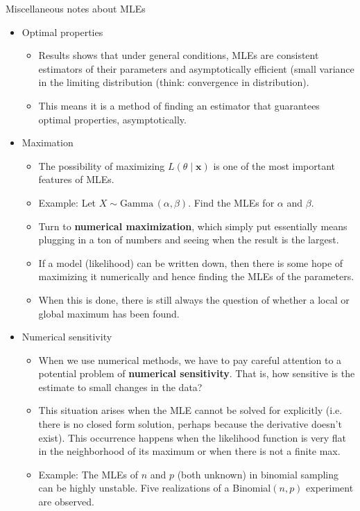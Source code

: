 \documentclass{article}
\newcommand{\follow}[1]{\sim \text{#1}\,}		%
\begin{document}
Miscellaneous notes about MLEs\bigskip
\begin{itemize}
    \item Optimal properties
    \begin{itemize}
        \item 	Results shows that under general conditions, MLEs are consistent estimators of their parameters and asymptotically efficient (small variance in the limiting distribution (think: convergence in distribution).
	\item This means it is a method of finding an estimator that guarantees optimal properties, asymptotically.
    \end{itemize}
    \item Maximation
    \begin{itemize}
         \item	 The possibility of maximizing $L(\theta \mid \mathbf{x})$ is one of the most important features of MLEs.
         \item Example: Let $X \follow{Gamma}(\alpha, \beta)$. Find the MLEs for $\alpha$ and $\beta$.\vspace{70pt}
        \item Turn to \textbf{numerical maximization}, which simply put essentially means plugging in a ton of numbers and seeing when the result is the largest.
        \item[] If a model (likelihood) can be written down, then there is some hope of maximizing it numerically and hence finding the MLEs of the parameters.
        \item[] When this is done, there is still always the question of whether a local or global maximum has been found.
    \end{itemize}\bigskip
    \item Numerical sensitivity
    \begin{itemize}
        \item When we use numerical methods, we have to pay careful attention to a potential problem of \textbf{numerical sensitivity}. That is, how sensitive is the estimate to small changes in the data?
        \item This situation arises when the MLE cannot be solved for explicitly (i.e. there is no closed form solution, perhaps because the derivative doesn't exist). This occurrence happens when the likelihood function is very flat in the neighborhood of its maximum or when there is not a finite max.
        \item Example: The MLEs of $n$ and $p$ (both unknown) in binomial sampling can be highly unstable. Five realizations of a Binomial$(n, p)$ experiment are observed.

\end{itemize}
\end{itemize}
\end{document}
